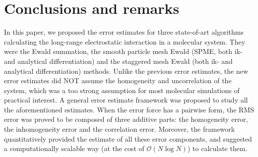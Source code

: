 \documentclass[aps,pre,preprint,unsortedaddress]{revtex4}
\newcommand{\redc}[1]{{\color{red} #1}}
\begin{document}
{%

}



\section{Conclusions and remarks}
\label{sec:conclusions}

In this paper, we proposed the error estimates for three state-of-art
algorithms calculating the long-range electrostatic interaction in a
molecular system. They were the Ewald summation, the smooth particle
mesh Ewald (SPME, both ik- and analytical differentiation) and
the staggered mesh Ewald (both ik- and analytical differentiation) methods.
Unlike the previous error estimates, the new error estimates did NOT
assume the homogeneity and uncorrelation of the system, which was a too
strong assumption for most molecular simulations of practical
interest.  A general error estimate framework was proposed
to study all the aforementioned estimates.
When the error force has a pairwise form,
the RMS error was proved to be composed \redc{of} three additive parts:
the homogeneity error, the inhomogeneity error and the correlation
error.
Moreover, the framework quantitatively provided the estimate
of all these error components, and suggested a computationally
scalable way (at the cost of $\mathcal O(N\log N)$) to calculate them.



\end{document}

